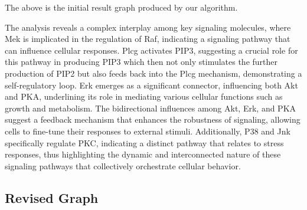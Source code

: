 \documentclass{article}
\begin{document}
The above is the initial result graph produced by our algorithm.

The analysis reveals a complex interplay among key signaling molecules, where Mek is implicated in the regulation of Raf, indicating a signaling pathway that can influence cellular responses. Plcg activates PIP3, suggesting a crucial role for this pathway in producing PIP3 which then not only stimulates the further production of PIP2 but also feeds back into the Plcg mechanism, demonstrating a self-regulatory loop. Erk emerges as a significant connector, influencing both Akt and PKA, underlining its role in mediating various cellular functions such as growth and metabolism. The bidirectional influences among Akt, Erk, and PKA suggest a feedback mechanism that enhances the robustness of signaling, allowing cells to fine-tune their responses to external stimuli. Additionally, P38 and Jnk specifically regulate PKC, indicating a distinct pathway that relates to stress responses, thus highlighting the dynamic and interconnected nature of these signaling pathways that collectively orchestrate cellular behavior.

\subsection{Revised Graph}
\end{document}
